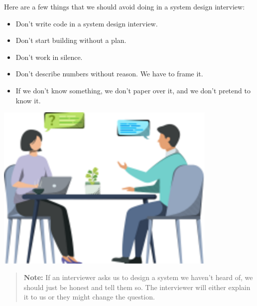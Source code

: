 \noindent
\begin{minipage}[t]{0.48\textwidth}
Here are a few things that we should avoid doing in a system design interview:

\begin{itemize}
\tightlist
\item
Don't write code in a system design interview.
\item
Don't start building without a plan.
\item
Don't work in silence.
\item
Don't describe numbers without reason. We have to frame it.
\item
If we don't know something, we don't paper over it, and we don't pretend to know it.
\end{itemize}
\end{minipage}
\hfill
\begin{minipage}[t]{0.48\textwidth}
\includegraphics[width=0.8\textwidth]{Images/chapter_1/section_6043988183744512/5474049268776960.png}
\end{minipage}

\begin{quote}
\textbf{Note:} If an interviewer asks us to design a system we haven't heard of, we should just be honest and tell them so. The interviewer will either explain it to us or they might change the question.
\end{quote}



